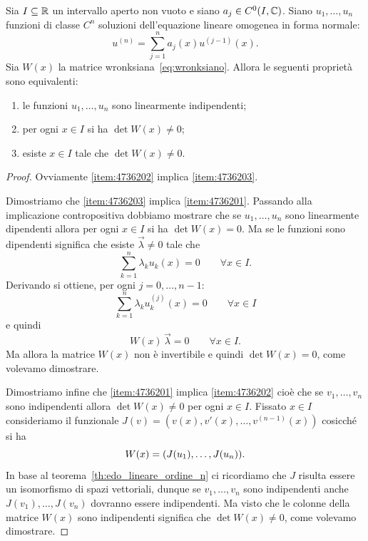 \begin{theorem}%
\label{th:wronksiano}%
Sia $I\subseteq \mathbb R$ un intervallo aperto non vuoto e siano $a_j\in C^0(I,\mathbb C)$.
Siano $u_1, \dots, u_n$ funzioni di classe $C^n$ soluzioni
dell'equazione lineare omogenea in forma normale:
\begin{equation}\label{eq:092784}
  u^{(n)} = \sum_{j=1}^n a_j(x) u^{(j-1)}(x).
\end{equation}
Sia $W(x)$ la matrice wronksiana~\eqref{eq:wronksiano}.
Allora le seguenti proprietà sono equivalenti:
\begin{enumerate}
\item \label{item:4736201} le funzioni $u_1,\dots, u_n$ sono linearmente indipendenti;
\item \label{item:4736202} per ogni $x\in I$ si ha $\det W(x)\neq 0$;
\item \label{item:4736203} esiste $x\in I$ tale che $\det W(x)\neq 0$.
\end{enumerate}
\end{theorem}

\begin{proof}
Ovviamente \ref{item:4736202} implica \ref{item:4736203}.

Dimostriamo che \ref{item:4736203} implica \ref{item:4736201}.
Passando alla implicazione contropositiva dobbiamo mostrare che
se $u_1,\dots, u_n$ sono linearmente dipendenti allora per ogni $x\in I$ si ha $\det W(x)=0$. Ma se le funzioni sono dipendenti significa che esiste $\vec \lambda \neq 0$ tale che
\begin{equation}\label{eq:3675893}
\sum_{k=1}^n \lambda_k u_k(x) = 0\qquad \forall x \in I.
\end{equation}
Derivando si ottiene, per ogni $j=0,\dots, n-1$:
\[
\sum_{k=1}^n \lambda_k u_k^{(j)}(x) = 0\qquad \forall x \in I
\]
e quindi
\[
  W(x) \, \vec \lambda = 0 \qquad \forall x\in I.
\]
Ma allora la matrice $W(x)$ non è invertibile e quindi $\det W(x)=0$, come volevamo dimostrare.

Dimostriamo infine che \ref{item:4736201} implica \ref{item:4736202}
cioè che se $v_1, \dots, v_n$ sono indipendenti allora $\det W(x) \neq 0$ per ogni $x\in I$.
Fissato $x\in I$ consideriamo il funzionale $J(v) = (v(x),v'(x), \dots, v^{(n-1)}(x))$ cosicché si ha
\[
  W(x) = {\left( J(u_1), \dots, J(u_n) \right)}.
\]
In base al teorema~\ref{th:edo_lineare_ordine_n} ci ricordiamo che $J$ risulta essere un isomorfismo di spazi vettoriali, dunque se $v_1,\dots,v_n$ sono indipendenti anche $J(v_1),\dots, J(v_n)$ dovranno essere indipendenti.
Ma visto che le colonne della matrice $W(x)$ sono indipendenti significa che $\det W(x)\neq 0$, come volevamo dimostrare.
\end{proof}

